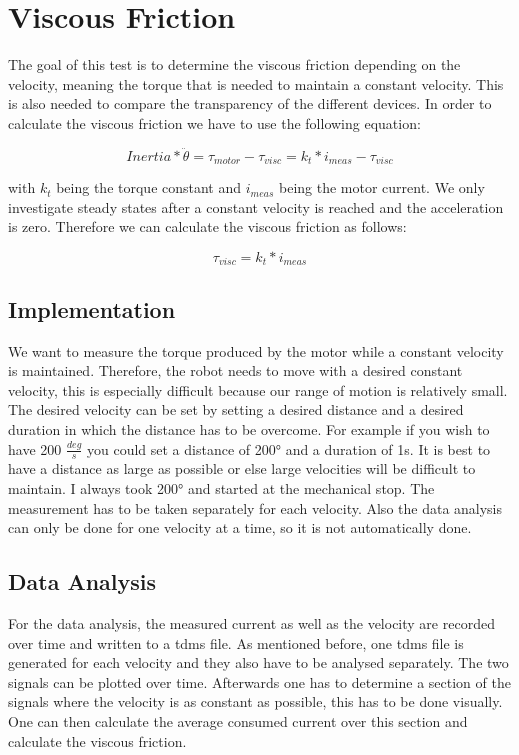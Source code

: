 \section{Viscous Friction}

The goal of this test is to determine the viscous friction depending on the velocity, meaning the torque that is needed to maintain a constant velocity. This is also needed to compare the transparency of the different devices. In order to calculate the viscous friction we have to use the following equation:

\begin{equation}
    Inertia * \ddot\theta = \tau_{motor} - \tau_{visc} = k_{t}*i_{meas} -\tau_{visc}
\end{equation}

with $k_{t}$ being the torque constant and $i_{meas}$ being the motor current. We only investigate steady states after a constant velocity is reached and the acceleration is zero. Therefore we can calculate the viscous friction as follows:

\begin{equation}
    \tau_{visc} = k_{t}*i_{meas}
\end{equation}

\subsection{Implementation}

We want to measure the torque produced by the motor while a constant velocity is maintained. Therefore, the robot needs to move with a desired constant velocity, this is especially difficult because our range of motion is relatively small. The desired velocity can be set by setting a desired distance and a desired duration in which the distance has to be overcome. For example if you wish to have 200 $\frac{deg}{s}$ you could set a distance of 200° and a duration of 1s. It is best to have a distance as large as possible or else large velocities will be difficult to maintain. I always took 200° and started at the mechanical stop. The measurement has to be taken separately for each velocity. Also the data analysis can only be done for one velocity at a time, so it is not automatically done.

\subsection{Data Analysis}

For the data analysis, the measured current as well as the velocity are recorded over time and written to a tdms file. As mentioned before, one tdms file is generated for each velocity and they also have to be analysed separately. The two signals can be plotted over time. Afterwards one has to determine a section of the signals where the velocity is as constant as possible, this has to be done visually. One can then calculate the average consumed current over this section and calculate the viscous friction. 

